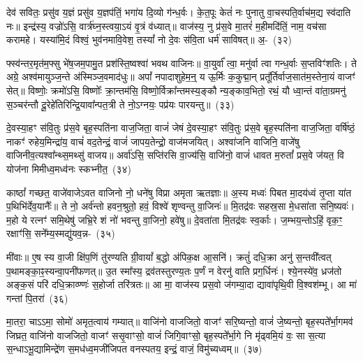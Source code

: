 {}%

देव॑ सवितः॒ प्रसु॑व य॒ज्ञं प्रसु॑व य॒ज्ञप॑तिं॒ भगा॑य दि॒व्यो ग॑न्ध॒र्वः। के॒त॒पूः केतं॑ नः पुनातु वा॒चस्पति॒र्वाच॑म॒द्य स्व॑दाति नः॥ इन्द्र॑स्य॒ वज्रो॑\-ऽसि॒ वार्त्र॑घ्न॒स्त्वया॒\-ऽयं वृ॒त्रं व॑ध्यात्॥ वाज॑स्य॒ नु प्र॑स॒वे मा॒तरं॑ म॒हीमदि॑तिं॒ नाम॒ वच॑सा करामहे। यस्या॑मि॒दं विश्वं॒ भुव॑नमावि॒वेश॒ तस्यां᳚ नो दे॒वः स॑वि॒ता धर्म॑ साविषत्॥ अ॒-~(३२)

फ्स्व॑न्तर॒मृत॑म॒फ्सु भे॑ष॒जम॒पामु॒त प्रश॑स्ति॒ष्वश्वा॑ भवथ वाजिनः॥ वा॒युर्वा᳚ त्वा॒ मनु॑र्वा त्वा गन्ध॒र्वाः स॒प्तविꣳ॑शतिः। ते अग्रे॒ अश्व॑मायुञ्ज॒न्ते अ॑स्मिञ्ज॒वमाद॑धुः॥ अपां᳚ नपादाशुहेम॒न्॒ य ऊ॒र्मिः क॒कुद्मा॒न् प्रतू᳚र्तिर्वाज॒सात॑म॒स्तेना॒यं वाजꣳ॑ सेत्॥ विष्णोः॒ क्रमो॑\-ऽसि॒ विष्णोः᳚ क्रा॒न्तम॑सि॒ विष्णो॒र्विक्रा᳚न्तमस्य॒ङ्कौ न्य॒ङ्काव॒भितो॒ रथं॒ यौ ध्वा॒न्तं वा॑ता॒ग्रमनु॑ स॒ञ्चर॑न्तौ दू॒रेहे॑तिरिन्द्रि॒यावा᳚न्पत॒त्री ते नो॒\-ऽग्नयः॒ पप्र॑यः पारयन्तु॥~(३३)

{\anuvakamend[{अ॒फ्सु न्य॒ङ्कौ पञ्च॑दश च}]}%

दे॒वस्या॒हꣳ स॑वि॒तुः प्र॑स॒वे बृह॒स्पति॑ना वाज॒जिता॒ वाजं॑ जेषं दे॒वस्या॒हꣳ स॑वि॒तुः प्र॑स॒वे बृह॒स्पति॑ना वाज॒जिता॒ वर्\mbox{}षि॑ष्ठं॒ नाकꣳ॑ रुहेय॒मिन्द्रा॑य॒ वाचं॑ वद॒तेन्द्रं॒ वाजं॑ जापय॒तेन्द्रो॒ वाज॑मजयित्। अश्वा॑जनि वाजिनि॒ वाजे॑षु वाजिनीव॒त्यश्वा᳚न्थ्स॒मथ्सु॑ वाजय॥ अर्वा॑ऽसि॒ सप्ति॑रसि वा॒ज्य॑सि॒ वाजि॑नो॒ वाजं॑ धावत म॒रुतां᳚ प्रस॒वे ज॑यत॒ वि योज॑ना मिमीध्व॒मध्व॑नः स्कभ्नीत॒~(३४)

काष्ठां᳚ गच्छत॒ वाजे॑वाजे\-ऽवत वाजिनो नो॒ धने॑षु विप्रा अमृता ऋतज्ञाः॥ अ॒स्य मध्वः॑ पिबत मा॒दय॑ध्वं तृ॒प्ता या॑त प॒थिभि॑र्देव॒यानैः᳚॥ ते नो॒ अर्व॑न्तो हवन॒श्रुतो॒ हवं॒ विश्वे॑ शृण्वन्तु वा॒जिनः॑॥ मि॒तद्र॑वः सहस्र॒सा मे॒धसा॑ता सनि॒ष्यवः॑। म॒हो ये रत्नꣳ॑ समि॒थेषु॑ जभ्रि॒रे शं नो॑ भवन्तु वा॒जिनो॒ हवे॑षु॥ दे॒वता॑ता मि॒तद्र॑वः स्व॒र्काः। ज॒म्भय॒न्तो\-ऽहिं॒ वृक॒ꣳ॒ रक्षाꣳ॑सि॒ सने᳚म्य॒स्मद्यु॑यव॒न्न-~(३५)

मी॑वाः॥ ए॒ष स्य वा॒जी क्षि॑प॒णिं तु॑रण्यति ग्री॒वायां᳚ ब॒द्धो अ॑पिक॒क्ष आ॒सनि॑। क्रतुं॑ दधि॒क्रा अनु॑ स॒न्तवी᳚त्वत् प॒थामङ्का॒ꣴ॒स्यन्वा॒पनी॑फणत्॥ उ॒त स्मा᳚स्य॒ द्रव॑तस्तुरण्य॒तः प॒र्णं न वेरनु॑ वाति प्रग॒र्धिनः॑। श्ये॒नस्ये॑व॒ ध्रज॑तो अङ्क॒सं परि॑ दधि॒क्राव्ण्णः॑ स॒होर्जा तरि॑त्रतः॥ आ मा॒ वाज॑स्य प्रस॒वो ज॑गम्या॒दा द्यावा॑पृथि॒वी वि॒श्वश॑म्भू। आ मा॑ गन्तां पि॒तरा॑~(३६)

मा॒तरा॒ चा\-ऽ\-ऽमा॒ सोमो॑ अमृत॒त्वाय॑ गम्यात्॥ वाजि॑नो वाजजितो॒ वाजꣳ॑ सरि॒ष्यन्तो॒ वाजं॑ जे॒ष्यन्तो॒ बृह॒स्पते᳚र्भा॒गमव॑ जिघ्रत॒ वाजि॑नो वाजजितो॒ वाजꣳ॑ ससृ॒वाꣳसो॒ वाजं॑ जिगि॒वाꣳसो॒ बृह॒स्पते᳚र्भा॒गे नि मृ॑ढ्वमि॒यं वः॒ सा स॒त्या स॒न्धा\-ऽभू॒द्यामिन्द्रे॑ण स॒मध॑ध्व॒मजी॑जिपत वनस्पतय॒ इन्द्रं॒ वाजं॒ विमु॑च्यध्वम्॥~(३७)

